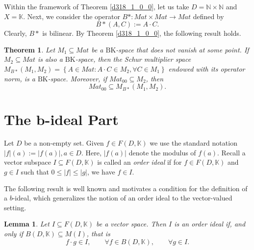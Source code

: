 \documentclass[14pt, a4paper]{article}  %
\providecommand{\llave}[1]{\left\lbrace #1\right\rbrace }
\providecommand{\pare}[1]{\left( #1\right) }
\providecommand{\abs}[1]{\left\lvert#1\right\rvert}
\newcommand{\K}{\mathbb{K}}
\newcommand{\N}{\mathbb{N}}
\newcommand{\BK}{\text{BK}}
\newtheorem{theorem}{Theorem}[section]
\newtheorem{lemma}{Lemma}[section]
\newtheorem{definition}{Definition}[section]
\begin{document}
Within the framework of Theorem \ref{d318_1_0_0}, let us take $D=\N\times \N$ and $X=\K$. Next, we consider the operator $B \ast: Mat  \times Mat \to Mat $ defined by  
\begin{equation}
	\text{$B \ast$}\pare{A,C}:=A\cdot C.
\end{equation}
Clearly, $\text{$B \ast$}$ is bilinear. By Theorem \ref{d318_1_0_0}, the following result holds.

\begin{theorem}
	Let $M_{1}\subseteq Mat $ be a $\BK$-space that does not vanish at some point. If $M_{2}\subseteq Mat $ is also a $\BK$-space, then the Schur multiplier space $M_{\text{$B \ast$}}\pare{M_{1},M_{2}}=\llave{A\in Mat :A\cdot  C\in M_{2},\forall C\in M_{1}}$
	endowed with its operator norm, is a $\BK$-space. Moreover, if $Mat _{00}\subseteq M_{2}$, then
	\begin{equation}
		Mat _{00}\subseteq M_{\text{$B \ast$}}\pare{M_{1},M_{2}}.
	\end{equation}
\end{theorem}

\section{The b-ideal Part}\label{pop7}

 	Let $D$ be a non-empty set. Given $f \in F(D, \K)$ we use the standard notation  $|f|(a) := |f(a)|,  a \in D$. Here, $|f(a)|$  denote the modulus  of $f(a)$.   Recall a vector subspace $I \subseteq F(D,\K)$ is called an \emph{order ideal} if for  $f \in F(D,\K)$ and $g \in I$ such that $0 \le \abs{f} \le \abs{g}$, we have $f \in I$.\

%	

The following result is well known and motivates a condition for the definition of a $b$-ideal, which generalizes the notion of an order ideal to the vector-valued setting.  

	\begin{lemma}\label{d231_1*_1}
		Let $I \subseteq F(D, \K)$ be a vector space. Then $I$ is an order ideal if, and only if $B(D,\K) \subseteq M(I)$, that is \begin{equation}\label{tu}
			f \cdot g \in I,\qquad  \forall f \in B(D, \K),\qquad  \forall g \in I.
		\end{equation}  
	\end{lemma} 
	 
\end{document}
